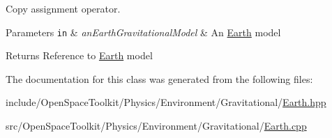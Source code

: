 Copy assignment operator. 


\begin{DoxyParams}[1]{Parameters}
\mbox{\tt in}  & {\em an\+Earth\+Gravitational\+Model} & An \hyperlink{classostk_1_1physics_1_1environment_1_1gravitational_1_1_earth}{Earth} model \\
\hline
\end{DoxyParams}
\begin{DoxyReturn}{Returns}
Reference to \hyperlink{classostk_1_1physics_1_1environment_1_1gravitational_1_1_earth}{Earth} model 
\end{DoxyReturn}


The documentation for this class was generated from the following files\+:\begin{DoxyCompactItemize}
\item 
include/\+Open\+Space\+Toolkit/\+Physics/\+Environment/\+Gravitational/\hyperlink{_gravitational_2_earth_8hpp}{Earth.\+hpp}\item 
src/\+Open\+Space\+Toolkit/\+Physics/\+Environment/\+Gravitational/\hyperlink{_gravitational_2_earth_8cpp}{Earth.\+cpp}\end{DoxyCompactItemize}
